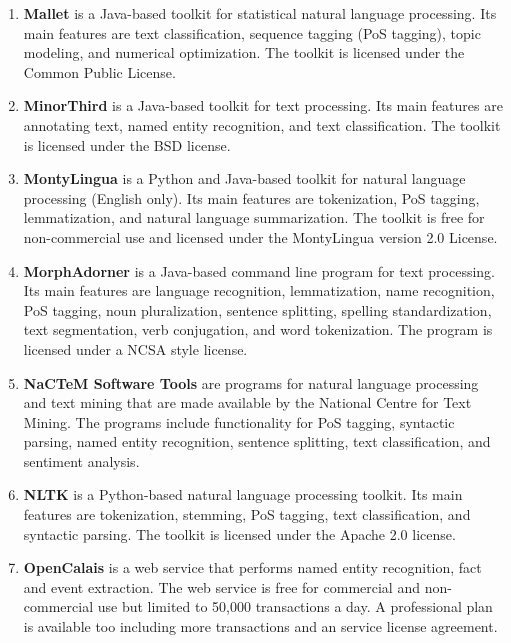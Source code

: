 \begin{enumerate}
	\item \textbf{Mallet} \cite{mccallum2002mallet} is a Java-based toolkit for statistical natural language processing. Its main features are text classification, sequence tagging (PoS tagging), topic modeling, and numerical optimization.
The toolkit is licensed under the Common Public License.

	\item \textbf{MinorThird} \cite{cohen2004minorthird} is a Java-based toolkit for text processing. Its main features are annotating text, named entity recognition, and text classification.
The toolkit is licensed under the BSD license.

	\item \textbf{MontyLingua} \cite{liu2004montylingua} is a Python and Java-based toolkit for natural language processing (English only). Its main features are tokenization, PoS tagging, lemmatization, and natural language summarization.
The toolkit is free for non-commercial use and licensed under the MontyLingua version 2.0 License.

	\item \textbf{MorphAdorner} \cite{morphadorner} is a Java-based command line program for text processing. Its main features are language recognition, lemmatization, name recognition, PoS tagging, noun pluralization, sentence splitting, spelling standardization, text segmentation, verb conjugation, and word tokenization.
The program is licensed under a NCSA style license.

	\item \textbf{NaCTeM Software Tools} \cite{nactem} are programs for natural language processing and text mining that are made available by the National Centre for Text Mining. The programs include functionality for PoS tagging, syntactic parsing, named entity recognition, sentence splitting, text classification, and sentiment analysis.

	\item \textbf{NLTK} \cite{loper2002nltk} is a Python-based natural language processing toolkit. Its main features are tokenization, stemming, PoS tagging, text classification, and syntactic parsing.
The toolkit is licensed under the Apache 2.0 license.

	\item \textbf{OpenCalais} \cite{opencalais} is a web service that performs named entity recognition, fact and event extraction.
The web service is free for commercial and non-commercial use but limited to 50,000 transactions a day. A professional plan is available too including more transactions and an service license agreement.


\end{enumerate}
